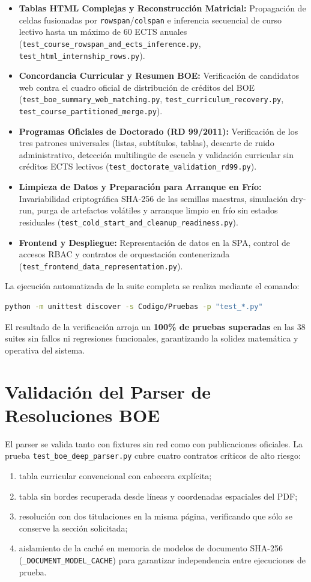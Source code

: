\begin{itemize}
    \item \textbf{Tablas HTML Complejas y Reconstrucción Matricial:} Propagación de celdas fusionadas por \texttt{rowspan}/\texttt{colspan} e inferencia secuencial de curso lectivo hasta un máximo de 60 ECTS anuales (\nolinkurl{test_course_rowspan_and_ects_inference.py}, \nolinkurl{test_html_internship_rows.py}).
    \item \textbf{Concordancia Curricular y Resumen BOE:} Verificación de candidatos web contra el cuadro oficial de distribución de créditos del BOE (\nolinkurl{test_boe_summary_web_matching.py}, \nolinkurl{test_curriculum_recovery.py}, \nolinkurl{test_course_partitioned_merge.py}).
    \item \textbf{Programas Oficiales de Doctorado (RD 99/2011):} Verificación de los tres patrones universales (listas, subtítulos, tablas), descarte de ruido administrativo, detección multilingüe de escuela y validación curricular sin créditos ECTS lectivos (\nolinkurl{test_doctorate_validation_rd99.py}).
    \item \textbf{Limpieza de Datos y Preparación para Arranque en Frío:} Invariabilidad criptográfica SHA-256 de las semillas maestras, simulación dry-run, purga de artefactos volátiles y arranque limpio en frío sin estados residuales (\nolinkurl{test_cold_start_and_cleanup_readiness.py}).
    \item \textbf{Frontend y Despliegue:} Representación de datos en la SPA, control de accesos RBAC y contratos de orquestación contenerizada (\nolinkurl{test_frontend_data_representation.py}).
\end{itemize}

La ejecución automatizada de la suite completa se realiza mediante el comando:
\begin{lstlisting}[language=bash]
python -m unittest discover -s Codigo/Pruebas -p "test_*.py"
\end{lstlisting}
El resultado de la verificación arroja un \textbf{100\% de pruebas superadas} en las 38 suites sin fallos ni regresiones funcionales, garantizando la solidez matemática y operativa del sistema.

\section{Validación del Parser de Resoluciones BOE}
El parser se valida tanto con fixtures sin red como con publicaciones oficiales. La prueba \texttt{test\_boe\_deep\_parser.py} cubre cuatro contratos críticos de alto riesgo:
\begin{enumerate}
    \item tabla curricular convencional con cabecera explícita;
    \item tabla sin bordes recuperada desde líneas y coordenadas espaciales del PDF;
    \item resolución con dos titulaciones en la misma página, verificando que sólo se conserve la sección solicitada;
    \item aislamiento de la caché en memoria de modelos de documento SHA-256 (\texttt{\_DOCUMENT\_MODEL\_CACHE}) para garantizar independencia entre ejecuciones de prueba.
\end{enumerate}

